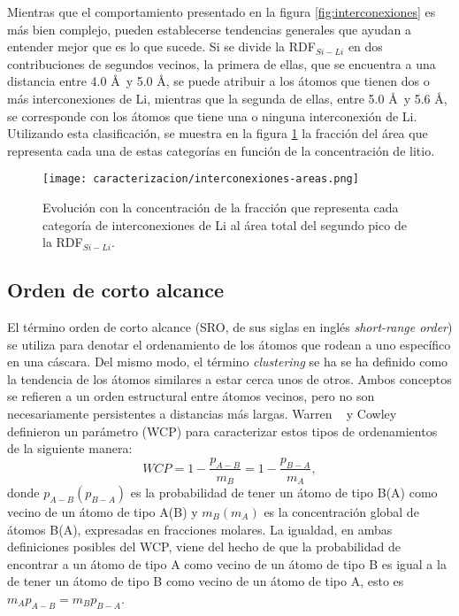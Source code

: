 Mientras que el comportamiento presentado en la figura \ref{fig:interconexiones}
es más bien complejo, pueden establecerse tendencias generales que ayudan a 
entender mejor que es lo que sucede. Si se divide la RDF$_{Si-Li}$ en dos 
contribuciones de segundos vecinos, la primera de ellas, que se encuentra a una
distancia entre 4.0 \AA\ y 5.0 \AA, se puede atribuir a los átomos que tienen dos 
o más interconexiones de Li, mientras que la segunda de ellas, entre 5.0 \AA\ y
5.6 \AA, se corresponde con los átomos que tiene una o ninguna interconexión de 
Li. Utilizando esta clasificación, se muestra en la figura 
\ref{fig:interconexiones-areas} la fracción del área que representa cada una de
estas categorías en función de la concentración de litio.
\begin{figure}[th]
    \centering
    \texttt{[image: caracterizacion/interconexiones-areas.png]}
    \caption{Evolución con la concentración de la fracción que representa cada
    categoría de interconexiones de Li al área total del segundo pico de la 
    RDF$_{Si-Li}$.}
    \label{fig:interconexiones-areas}
\end{figure}

\subsection{Orden de corto alcance}

El término orden de corto alcance (SRO, de sus siglas en inglés 
\textit{short-range order}) se utiliza para denotar el ordenamiento de los átomos
que rodean a uno específico en una cáscara. Del mismo modo, el término 
\textit{clustering} se ha se ha definido como la tendencia de los átomos 
similares a estar cerca unos de otros. Ambos conceptos se refieren a un orden 
estructural entre átomos vecinos, pero no son necesariamente persistentes a 
distancias más largas. Warren ~\cite{warren69} y Cowley ~\cite{cowley1950} 
definieron un parámetro (WCP) para caracterizar estos tipos de ordenamientos de 
la siguiente manera:
\begin{equation}
    WCP = 1 - \frac{p_{A-B}}{m_B} = 1 - \frac{p_{B-A}}{m_A},
\end{equation}
donde $p_{A-B}(p_{B-A})$ es la probabilidad de tener un átomo de tipo B(A) como
vecino de un átomo de tipo A(B) y $m_B(m_A)$ es la concentración global de átomos
B(A), expresadas en fracciones molares. La igualdad, en ambas definiciones 
posibles del WCP, viene del hecho de que la probabilidad de encontrar a un átomo 
de tipo A como vecino de un átomo de tipo B es igual a la de tener un átomo de 
tipo B como vecino de un átomo de tipo A, esto es $m_A p_{A-B} = m_B p_{B-A}$.

